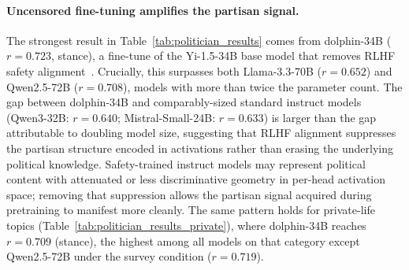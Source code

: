 \paragraph{Uncensored fine-tuning amplifies the partisan signal.}
The strongest result in Table~\ref{tab:politician_results} comes from dolphin-34B ($r = 0.723$, stance), a fine-tune of the Yi-1.5-34B base model that removes RLHF safety alignment~\cite{cognitivecomputations2024dolphin}. Crucially, this surpasses both Llama-3.3-70B ($r = 0.652$) and Qwen2.5-72B ($r = 0.708$), models with more than twice the parameter count. The gap between dolphin-34B and comparably-sized standard instruct models (Qwen3-32B: $r = 0.640$; Mistral-Small-24B: $r = 0.633$) is larger than the gap attributable to doubling model size, suggesting that RLHF alignment suppresses the partisan structure encoded in activations rather than erasing the underlying political knowledge. Safety-trained instruct models may represent political content with attenuated or less discriminative geometry in per-head activation space; removing that suppression allows the partisan signal acquired during pretraining to manifest more cleanly. The same pattern holds for private-life topics (Table~\ref{tab:politician_results_private}), where dolphin-34B reaches $r = 0.709$ (stance), the highest among all models on that category except Qwen2.5-72B under the survey condition ($r = 0.719$).

